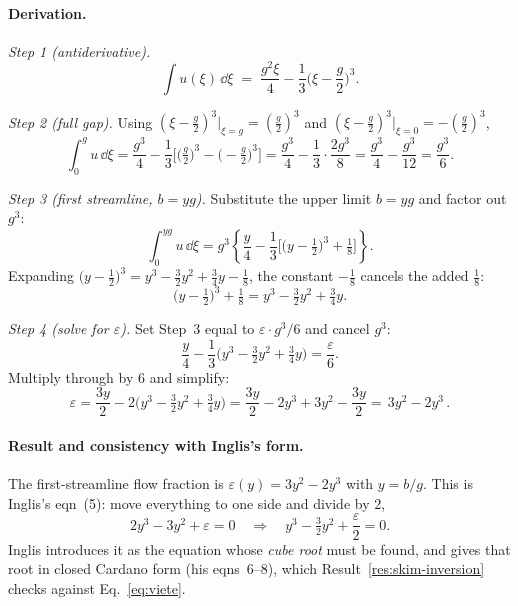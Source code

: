 \paragraph{Derivation.}
\emph{Step 1 (antiderivative).}
\begin{equation}
\int u(\xi)\,\dd\xi \;=\; \frac{g^2 \xi}{4} - \frac{1}{3}\Big(\xi - \frac{g}{2}\Big)^3.
\end{equation}

\emph{Step 2 (full gap).} Using $(\xi-\tfrac g2)^3\big|_{\xi=g} = (\tfrac g2)^3$ and
$(\xi-\tfrac g2)^3\big|_{\xi=0} = -(\tfrac g2)^3$,
\begin{equation}
\int_0^{g} u\,\dd\xi = \frac{g^3}{4} - \frac{1}{3}\Big[\Big(\tfrac g2\Big)^3 - \Big(-\tfrac g2\Big)^3\Big]
= \frac{g^3}{4} - \frac{1}{3}\cdot\frac{2g^3}{8}
= \frac{g^3}{4} - \frac{g^3}{12}
= \frac{g^3}{6}.
\end{equation}

\emph{Step 3 (first streamline, $b = yg$).} Substitute the upper limit $b=yg$ and factor out $g^3$:
\begin{equation}
\int_0^{yg} u\,\dd\xi
= g^3\!\left\{ \frac{y}{4} - \frac{1}{3}\Big[\big(y-\tfrac12\big)^3 + \tfrac18\Big] \right\}.
\end{equation}
Expanding $\big(y-\tfrac12\big)^3 = y^3 - \tfrac32 y^2 + \tfrac34 y - \tfrac18$, the constant
$-\tfrac18$ cancels the added $\tfrac18$:
\begin{equation}
\big(y-\tfrac12\big)^3 + \tfrac18 = y^3 - \tfrac32 y^2 + \tfrac34 y.
\end{equation}

\emph{Step 4 (solve for $\varepsilon$).} Set Step~3 equal to $\varepsilon\cdot g^3/6$ and
cancel $g^3$:
\begin{equation}
\frac{y}{4} - \frac{1}{3}\Big(y^3 - \tfrac32 y^2 + \tfrac34 y\Big) = \frac{\varepsilon}{6}.
\end{equation}
Multiply through by $6$ and simplify:
\begin{equation}
\varepsilon = \frac{3y}{2} - 2\Big(y^3 - \tfrac32 y^2 + \tfrac34 y\Big)
= \frac{3y}{2} - 2y^3 + 3y^2 - \frac{3y}{2}
= \boxed{\,3y^2 - 2y^3\,}.
\label{eq:r3}
\end{equation}

\paragraph{Result and consistency with Inglis's form.} The first-streamline flow fraction is
$\varepsilon(y) = 3y^2 - 2y^3$ with $y=b/g$. This is Inglis's eqn~(5): move everything to one
side and divide by $2$,
\begin{equation}
2y^3 - 3y^2 + \varepsilon = 0 \quad\Longrightarrow\quad y^3 - \tfrac32 y^2 + \frac{\varepsilon}{2} = 0 .
\end{equation}
Inglis introduces it as the equation whose \emph{cube root} must be found, and gives that root
in closed Cardano form (his eqns~6--8), which Result~\ref{res:skim-inversion} checks against
Eq.~\eqref{eq:viete}.

